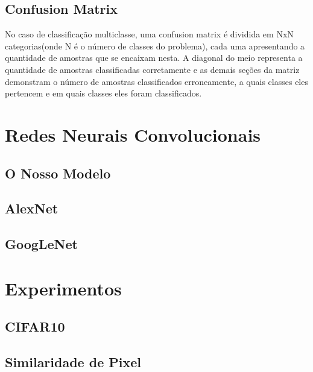 \documentclass[conference]{IEEEtran}
\begin{document}
\subsection{Confusion Matrix}
No caso de classificação multiclasse, uma confusion matrix é dividida em NxN categorias(onde N é o número de classes do problema), cada uma apresentando a quantidade de amostras que se encaixam nesta.
A diagonal do meio representa a quantidade de amostras classificadas corretamente e as demais seções da matriz demonstram o número de amostras classificados erroneamente, a quais classes eles pertencem e em quais classes eles foram classificados.

\cite{metrics}




\section{Redes Neurais Convolucionais}


\subsection{O Nosso Modelo}
\subsection{AlexNet}

\subsection{GoogLeNet}




\section{Experimentos}


\subsection{CIFAR10}


\subsection{Similaridade de Pixel}
\end{document}
